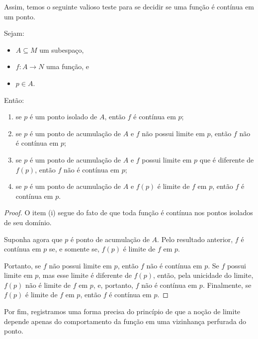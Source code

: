Assim, temos o seguinte valioso teste para se decidir se uma função é contínua em um ponto.

\begin{corollary}
    Sejam:
    \begin{itemize}
        \item $A\subseteq M$ um subespaço,
        \item $f: A \to N$ uma função, e
        \item $p \in A$.
    \end{itemize}
    Então:
    \begin{enumerate}[label=(\roman*)]
        \item se $p$ é um ponto isolado de $A$, então $f$ é contínua em $p$;
        \item se $p$ é um ponto de acumulação de $A$ e $f$ não possui limite em $p$, então $f$ não é contínua em $p$;
        \item se $p$ é um ponto de acumulação de $A$ e $f$ possui limite em $p$ que é diferente de $f(p)$, então $f$ não é contínua em $p$;
        \item se $p$ é um ponto de acumulação de $A$ e $f(p)$ é limite de $f$ em $p$, então $f$ é contínua em $p$.
    \end{enumerate}
\end{corollary}
\begin{proof}
    O item (i) segue do fato de que toda função é contínua nos pontos isolados de seu domínio.

    Suponha agora que $p$ é ponto de acumulação de $A$.
    Pelo resultado anterior, $f$ é contínua em $p$ se, e somente se, $f(p)$ é limite de $f$ em $p$.

    Portanto, se $f$ não possui limite em $p$, então $f$ não é contínua em $p$.
    Se $f$ possui limite em $p$, mas esse limite é diferente de $f(p)$, então, pela unicidade do limite, $f(p)$ não é limite de $f$ em $p$, e, portanto, $f$ não é contínua em $p$.
    Finalmente, se $f(p)$ é limite de $f$ em $p$, então $f$ é contínua em $p$.
\end{proof}


Por fim, registramos uma forma precisa do princípio de que a noção de limite depende apenas do comportamento da função em uma vizinhança perfurada do ponto.

